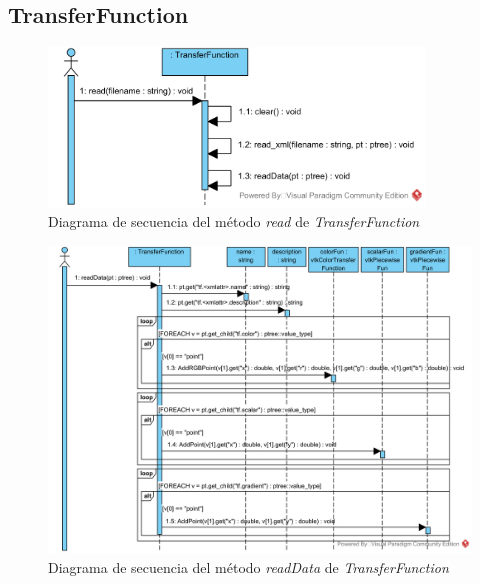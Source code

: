 \subsection{TransferFunction}

\begin{figure}[H]
	\centering
	\includegraphics[width=10cm]{imagenes/diagramas/secuencia/TransferFunction_ReadFromString}
	\caption{Diagrama de secuencia del método \textit{read} de \textit{TransferFunction}}
	\label{fig:diagrama_secuencia_transferfunction_read}
\end{figure}

\begin{figure}[H]
	\centering
	\includegraphics[width=12cm]{imagenes/diagramas/secuencia/TransferFunction_ReadData}
	\caption{Diagrama de secuencia del método \textit{readData} de \textit{TransferFunction}}
	\label{fig:diagrama_secuencia_transferfunction_readdata}
\end{figure}

